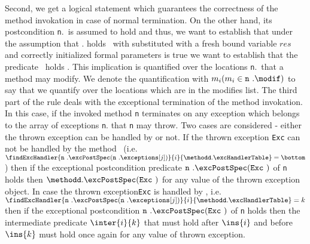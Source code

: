\begin{itemize}
						Second, we get a logical statement which guarantees the correctness of the method invokation
						in case of normal termination.
						On the other hand, its postcondition \mbox{\rm\texttt{n}}.\normalPost \ is assumed to hold and thus, we want to establish that 
						under the assumption that \methodd.\normalPost{}  holds \ with \result{} substituted with a fresh bound variable $ res$
						and correctly initialized formal parameters
						is true we want to establish that the predicate  \
						holds . This implication is quantified over the locations \mbox{\rm\texttt{n}}.\modif \ that a method may modify.
						We denote the quantification with $ m_i ( m_i \in \mbox{\rm\texttt{n} } .\modif ) $ to say that we quantify over the locations 
						which are in the modifies list.
						The third part of the rule deals with the exceptional termination of the method invokation.
						In this case, if the invoked method \texttt{n} terminates on any exception which belongs to the array of 
						exceptions \texttt{n}.\exceptions{} that \texttt{n} may throw. Two cases are considered - either the thrown
						exception can be handled by \methodd{} or not. If the thrown exception  \texttt{Exc} can not be handled
						by the method \methodd \
						(i.e. $\findExcHandler{ \mbox{\rm\texttt{n} }.\excPostSpec ( \mbox{\rm\texttt{n} }.\exceptions[j])  }{i}
						{\methodd.\excHandlerTable} = \bottom $) then if the exceptional postcondition predicate
						$ \mbox{\rm\texttt{n} }.\excPostSpec ( \mbox{\rm\texttt{Exc} })  $ of \texttt{n} holds
						then  	$ \methodd.\excPostSpec ( \mbox{\rm\texttt{Exc} })  $ for any value of the thrown exception
						object. 
						In case the thrown  exception\texttt{Exc} is handled by \methodd, i.e. \\
						$ \findExcHandler{ \mbox{\rm\texttt{n} }.\excPostSpec 
						  ( \mbox{\rm\texttt{n} }.\exceptions[j])  }{i}{\methodd.\excHandlerTable} = k $   then if 
						the exceptional postcondition $ \mbox{\rm\texttt{n} }.\excPostSpec ( \mbox{\rm\texttt{Exc} })  $ 
						of \texttt{n} holds then the intermediate predicate $\inter{i}{k}$ 
						that must hold after $\ins{i}$ and before   $\ins{k}$ must hold once again for any value
						of thrown exception. 
						

\end{itemize}
